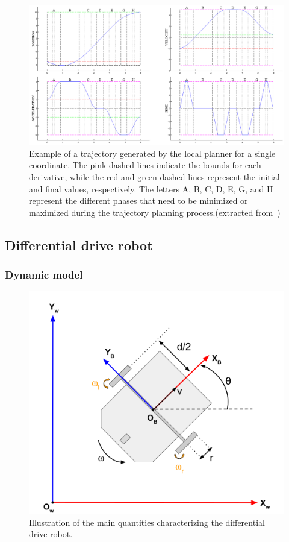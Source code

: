 \begin{figure} [t]
  \centering
  \includegraphics[width=0.99\linewidth]{figures/models/kino.png} 
  \caption{Example of a trajectory generated by the local planner for a single coordinate. The pink dashed lines indicate the bounds for each derivative, while the red and green dashed lines represent the initial and final values, respectively. 
  The letters A, B, C, D, E, G, and H represent the different phases that need to be minimized or maximized during the trajectory planning process.(extracted from~\cite{cKino})}%
  \label{fig:kino}%
\end{figure}

\subsection{Differential drive robot}\label{sec:unic_model}

\subsubsection{Dynamic model}

\begin{figure} [t]
  \centering
  \includegraphics[width=0.6\linewidth]{figures/models/unicycle.png} 
  \caption{Illustration of the main quantities characterizing the differential drive robot.}%
  \label{fig:unicycle}%
\end{figure}

